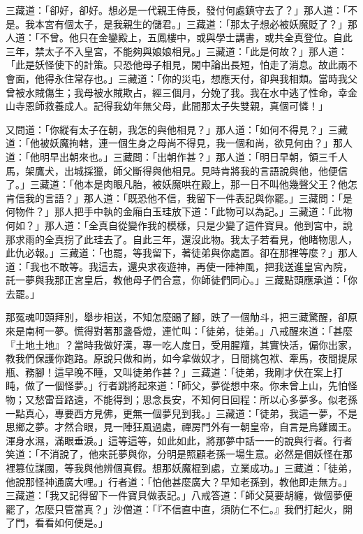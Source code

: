 三藏道：「卻好，卻好。想必是一代親王侍長，發付何處鎮守去了？」那人道：「不是。我本宮有個太子，是我親生的儲君。」三藏道：「那太子想必被妖魔貶了？」那人道：「不曾。他只在金鑾殿上，五鳳樓中，或與學士講書，或共全真登位。自此三年，禁太子不入皇宮，不能夠與娘娘相見。」三藏道：「此是何故？」那人道：「此是妖怪使下的計策。只恐他母子相見，閑中論出長短，怕走了消息。故此兩不會面，他得永住常存也。」三藏道：「你的災屯，想應天付，卻與我相類。當時我父曾被水賊傷生；我母被水賊欺占，經三個月，分娩了我。我在水中逃了性命，幸金山寺恩師救養成人。記得我幼年無父母，此間那太子失雙親，真個可憐！」

又問道：「你縱有太子在朝，我怎的與他相見？」那人道：「如何不得見？」三藏道：「他被妖魔拘轄，連一個生身之母尚不得見，我一個和尚，欲見何由？」那人道：「他明早出朝來也。」三藏問：「出朝作甚？」那人道：「明日早朝，領三千人馬，架鷹犬，出城採獵，師父斷得與他相見。見時肯將我的言語說與他，他便信了。」三藏道：「他本是肉眼凡胎，被妖魔哄在殿上，那一日不叫他幾聲父王？他怎肯信我的言語？」那人道：「既恐他不信，我留下一件表記與你罷。」三藏問：「是何物件？」那人把手中執的金廂白玉珪放下道：「此物可以為記。」三藏道：「此物何如？」那人道：「全真自從變作我的模樣，只是少變了這件寶貝。他到宮中，說那求雨的全真拐了此珪去了。自此三年，還沒此物。我太子若看見，他睹物思人，此仇必報。」三藏道：「也罷，等我留下，著徒弟與你處置。卻在那裡等麼？」那人道：「我也不敢等。我這去，還央求夜遊神，再使一陣神風，把我送進皇宮內院，託一夢與我那正宮皇后，教他母子們合意，你師徒們同心。」三藏點頭應承道：「你去罷。」

那冤魂叩頭拜別，舉步相送，不知怎麼踢了腳，跌了一個觔斗，把三藏驚醒，卻原來是南柯一夢。慌得對著那盞昏燈，連忙叫：「徒弟，徒弟。」八戒醒來道：「甚麼『土地土地』？當時我做好漢，專一吃人度日，受用腥羶，其實快活，偏你出家，教我們保護你跑路。原說只做和尚，如今拿做奴才，日間挑包袱、牽馬，夜間提尿瓶、務腳！這早晚不睡，又叫徒弟作甚？」三藏道：「徒弟，我剛才伏在案上打盹，做了一個怪夢。」行者跳將起來道：「師父，夢從想中來。你未曾上山，先怕怪物；又愁雷音路遠，不能得到；思念長安，不知何日回程：所以心多夢多。似老孫一點真心，專要西方見佛，更無一個夢兒到我。」三藏道：「徒弟，我這一夢，不是思鄉之夢。才然合眼，見一陣狂風過處，禪房門外有一朝皇帝，自言是烏雞國王。渾身水濕，滿眼垂淚。」這等這等，如此如此，將那夢中話一一的說與行者。行者笑道：「不消說了，他來託夢與你，分明是照顧老孫一場生意。必然是個妖怪在那裡篡位謀國，等我與他辨個真假。想那妖魔棍到處，立業成功。」三藏道：「徒弟，他說那怪神通廣大哩。」行者道：「怕他甚麼廣大？早知老孫到，教他即走無方。」三藏道：「我又記得留下一件寶貝做表記。」八戒答道：「師父莫要胡纏，做個夢便罷了，怎麼只管當真？」沙僧道：「『不信直中直，須防仁不仁。』我們打起火，開了門，看看如何便是。」

